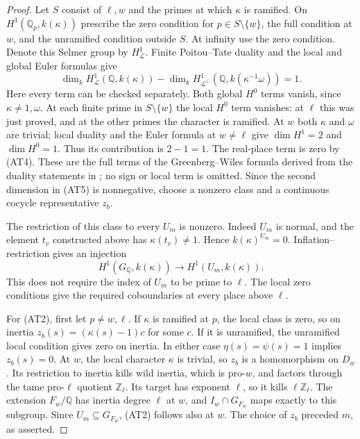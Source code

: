 \begin{proof}
Let $S$ consist of $\ell,w$ and the primes at which $\kappa$
is ramified.  On $H^1(\mathbb Q_p,k(\kappa))$ prescribe the
zero condition for $p\in S\setminus\{w\}$, the full
condition at $w$, and the unramified condition outside $S$.
At infinity use the zero condition.  Denote this Selmer
group by $H^1_{\mathcal L}$.  Finite Poitou--Tate duality
and the local and global Euler formulas give
\[
 \dim_k H^1_{\mathcal L}(\mathbb Q,k(\kappa))
 -\dim_k H^1_{\mathcal L^\perp}
          (\mathbb Q,k(\kappa^{-1}\omega))
 =1.                                                       \tag{AT5}
\]
Here every term can be checked separately.  Both global
$H^0$ terms vanish, since $\kappa\ne1,\omega$.  At each
finite prime in $S\setminus\{w\}$ the local $H^0$ term
vanishes: at $\ell$ this was just proved, and at the other
primes the character is ramified.  At $w$ both $\kappa$ and
$\omega$ are trivial; local duality and the Euler formula
at $w\ne\ell$ give $\dim H^1=2$ and $\dim H^0=1$.
Thus its contribution is $2-1=1$.  The real-place term is
zero by (AT4).  These are the full terms of the
Greenberg--Wiles formula derived from the duality statements
in \cite{AuxTowerDuality}; no sign or local term is omitted.
Since the second dimension in (AT5) is nonnegative, choose
a nonzero class and a continuous cocycle representative $z_b$.

The restriction of this class to every $U_m$ is nonzero.
Indeed $U_m$ is normal, and the element $t_v$ constructed
above has $\kappa(t_v)\ne1$.  Hence $k(\kappa)^{U_m}=0$.
Inflation--restriction gives an injection
\[
 H^1(G_{\mathbb Q},k(\kappa))\longrightarrow
                       H^1(U_m,k(\kappa)).               \tag{AT6}
\]
This does not require the index of $U_m$ to be prime to
$\ell$.  The local zero conditions give the required
coboundaries at every place above $\ell$.

For (AT2), first let $p\ne w,\ell$.  If $\kappa$ is
ramified at $p$, the local class is zero, so on inertia
$z_b(s)=(\kappa(s)-1)c$ for some $c$.  If it is unramified,
the unramified local condition gives zero on inertia.
In either case $\eta(s)=\psi(s)=1$ implies $z_b(s)=0$.
At $w$, the local character $\kappa$ is trivial, so $z_b$
is a homomorphism on $D_w$.  Its restriction to inertia
kills wild inertia, which is pro-$w$, and factors through
the tame pro-$\ell$ quotient $\mathbb Z_\ell$.  Its target
has exponent $\ell$, so it kills $\ell\mathbb Z_\ell$.
The extension $F_w/\mathbb Q$ has inertia degree $\ell$ at
$w$, and $I_w\cap G_{F_w}$ maps exactly to this subgroup.
Since $U_m\subseteq G_{F_w}$, (AT2) follows also at $w$.
The choice of $z_b$ preceded $m$, as asserted.
\end{proof}

